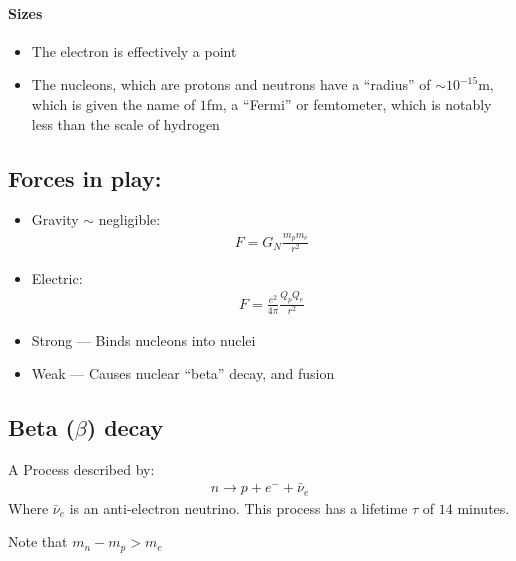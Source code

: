 \paragraph{Sizes}
\begin{itemize}
\item The electron is effectively a point
\item The nucleons, which are protons and neutrons have a ``radius'' of $\sim 10^{-15}$m, which is given the name of $1$fm, a ``Fermi'' or femtometer, which is notably less than the scale of hydrogen
\end{itemize}

\subsection{Forces in play:}
\begin{itemize}
\item Gravity $\sim$ negligible:
  \begin{align*}
    F=G_N\frac{m_p m_e}{r^2}
  \end{align*}
\item Electric:
  \begin{align*}
    F=\frac{e^2}{4\pi}\frac{Q_p Q_e}{r^2}
  \end{align*}
\item Strong --- Binds nucleons into nuclei
\item Weak --- Causes nuclear ``beta'' decay, and fusion
\end{itemize}

\subsection{Beta ($\beta$) decay}
A Process described by:
\begin{align*}
  n\to p+e^{-}+\bar{\nu}_e
\end{align*}
Where $\bar{\nu}_e$ is an anti-electron neutrino. This process has a lifetime $\tau$ of $14$ minutes.

Note that $m_n-m_p>m_e$

